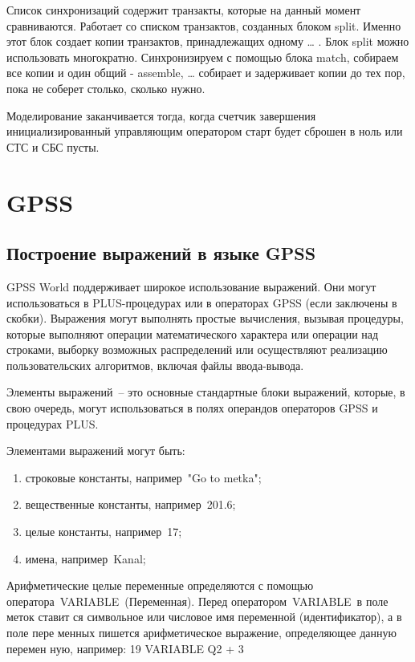 \documentclass[14pt]{extarticle}
\begin{document}
Список синхронизаций содержит транзакты, которые на данный момент сравниваются. Работает со списком транзактов, созданных блоком split. Именно этот блок создает копии транзактов, принадлежащих одному … . Блок split можно использовать многократно. Синхронизируем с помощью блока match, собираем все копии и один общий - assemble, … собирает и задерживает копии до тех пор, пока не соберет столько, сколько нужно. 

Моделирование заканчивается тогда, когда счетчик завершения инициализированный управляющим оператором старт будет сброшен в ноль или СТС и СБС пусты.

\newpage
\section*{GPSS}

\subsection*{Построение выражений в языке GPSS}

GPSS World поддерживает широкое использование выражений. Они могут использоваться в PLUS-процедурах или в операторах GPSS (если заключены в скобки). Выражения могут выполнять простые вычисления, вызывая процедуры, которые выполняют операции математического характера или операции над строками, выборку возможных распределений или осуществляют реализацию пользовательских алгоритмов, включая файлы ввода-вывода.

Элементы выражений – это основные стандартные блоки выражений, которые, в свою очередь, могут использоваться в полях операндов операторов GPSS и процедурах PLUS.

Элементами выражений могут быть:

\begin{enumerate}
	\item строковые константы, например "Go to metka";
	\item вещественные константы, например 201.6;
	\item целые константы, например 17;
	\item имена, например Kanal;
\end{enumerate}

Арифметические целые переменные определяются с помощью оператора VARIABLE (Переменная). Перед оператором VARIABLE в поле меток ставит ся символьное или числовое имя переменной (идентификатор), а в поле пере менных пишется арифметическое выражение, определяющее данную перемен ную, например: 
19 VARIABLE Q2 + 3
\end{document}
